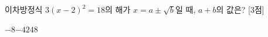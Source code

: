 이차방정식 $3(x-2)^2=18$의 해가 $x=a\pm\sqrt{b}$일 때, $a+b$의 값은?  \mbox{[3점]}
\begin{choices32}{$-8$}{$-4$}{$2$}{$4$}{$8$}\end{choices32}

